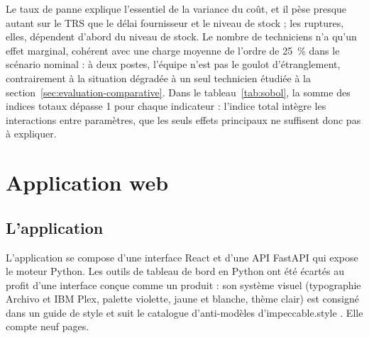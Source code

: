 \documentclass[11pt,a4paper,oneside]{report}
\begin{document}
Le taux de panne explique l'essentiel de la variance du coût, et il pèse presque autant sur le TRS que le délai fournisseur et le niveau de stock ; les ruptures, elles, dépendent d'abord du niveau de stock. Le nombre de techniciens n'a qu'un effet marginal, cohérent avec une charge moyenne de l'ordre de 25~\% dans le scénario nominal : à deux postes, l'équipe n'est pas le goulot d'étranglement, contrairement à la situation dégradée à un seul technicien étudiée à la section~\ref{sec:evaluation-comparative}. Dans le tableau~\ref{tab:sobol}, la somme des indices totaux dépasse 1 pour chaque indicateur : l'indice total intègre les interactions entre paramètres, que les seuls effets principaux ne suffisent donc pas à expliquer.

\chapter{Application web}\label{sec:application}

\section{L'application}

L'application se compose d'une interface React et d'une API FastAPI qui expose le moteur Python. Les outils de tableau de bord en Python ont été écartés au profit d'une interface conçue comme un produit : son système visuel (typographie Archivo et IBM Plex, palette violette, jaune et blanche, thème clair) est consigné dans un guide de style et suit le catalogue d'anti-modèles d'impeccable.style \cite{impeccable}. Elle compte neuf pages.
\end{document}
